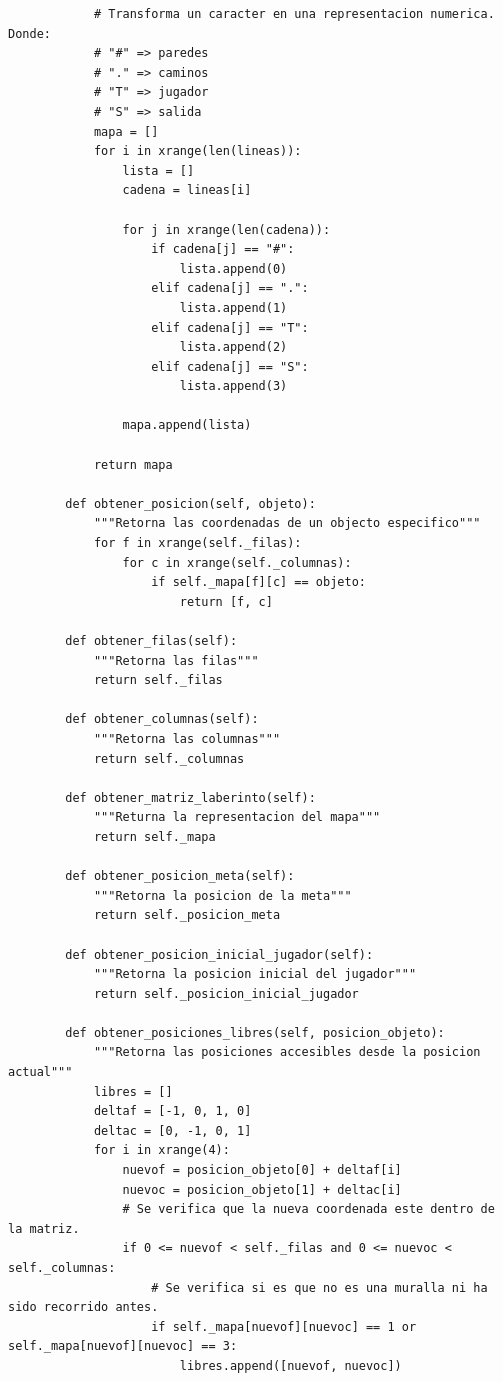 \documentclass[letter, titlepage, 10pt]{article}
\begin{document}
\begin{lstlisting}
            # Transforma un caracter en una representacion numerica. Donde:
            # "#" => paredes
            # "." => caminos
            # "T" => jugador
            # "S" => salida
            mapa = []
            for i in xrange(len(lineas)):
                lista = []
                cadena = lineas[i]
    
                for j in xrange(len(cadena)):
                    if cadena[j] == "#":
                        lista.append(0)
                    elif cadena[j] == ".":
                        lista.append(1)
                    elif cadena[j] == "T":
                        lista.append(2)
                    elif cadena[j] == "S":
                        lista.append(3)
    
                mapa.append(lista)
    
            return mapa
    
        def obtener_posicion(self, objeto):
            """Retorna las coordenadas de un objecto especifico"""
            for f in xrange(self._filas):
                for c in xrange(self._columnas):
                    if self._mapa[f][c] == objeto:
                        return [f, c]
    
        def obtener_filas(self):
            """Retorna las filas"""
            return self._filas
    
        def obtener_columnas(self):
            """Retorna las columnas"""
            return self._columnas
    
        def obtener_matriz_laberinto(self):
            """Returna la representacion del mapa"""
            return self._mapa
    
        def obtener_posicion_meta(self):
            """Retorna la posicion de la meta"""
            return self._posicion_meta
    
        def obtener_posicion_inicial_jugador(self):
            """Retorna la posicion inicial del jugador"""
            return self._posicion_inicial_jugador
    
        def obtener_posiciones_libres(self, posicion_objeto):
            """Retorna las posiciones accesibles desde la posicion actual"""
            libres = []
            deltaf = [-1, 0, 1, 0]
            deltac = [0, -1, 0, 1]
            for i in xrange(4):
                nuevof = posicion_objeto[0] + deltaf[i]
                nuevoc = posicion_objeto[1] + deltac[i]
                # Se verifica que la nueva coordenada este dentro de la matriz.
                if 0 <= nuevof < self._filas and 0 <= nuevoc < self._columnas:
                    # Se verifica si es que no es una muralla ni ha sido recorrido antes.
                    if self._mapa[nuevof][nuevoc] == 1 or self._mapa[nuevof][nuevoc] == 3:
                        libres.append([nuevof, nuevoc])
    

\end{lstlisting}
\end{document}
